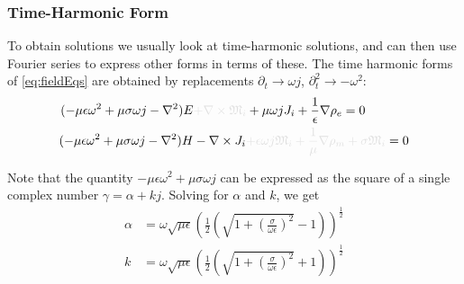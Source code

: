 \documentclass{article}
\numberwithin{equation}{section}
\begin{document}
        \subsubsection{Time-Harmonic Form}
            To obtain solutions we usually look at time-harmonic solutions, and can then
            use Fourier series to express other forms in terms of these. The time
            harmonic forms of \eqref{eq:fieldEqs} are obtained by replacements
            $\partial_t \to \omega j$, $\partial_t^2 \to - \omega^2$:
            \begin{subequations} \label{eq:fieldEqsTH}
                \begin{align}
                    (- \mu \epsilon \omega^2 + \mu \sigma \omega j - \nabla^2 ) E &
                        \begingroup \textcolor{vanish}{+ \nabla \times \mathfrak{M}_i}
                        \endgroup + \mu \omega j J_i + \frac{1}{\epsilon} \nabla \rho_e
                        = 0 \label{eq:electricFieldEqTH} \\
                    (-\mu \epsilon \omega^2 + \mu \sigma \omega j - \nabla^2 ) H & -
                        \nabla \times J_i \begingroup \textcolor{vanish}{+ \epsilon
                        \omega j \mathfrak{M}_i + \frac{1}{\mu} \nabla \rho_m + \sigma
                        \mathfrak{M}_i} \endgroup = 0 \label{eq:magneticFieldEqTH}
                \end{align}
            \end{subequations}

            Note that the quantity $- \mu \epsilon \omega^2 + \mu \sigma \omega j $ can be
            expressed as the square of a single complex number $\gamma = \alpha + kj$.
            Solving for $\alpha$ and $k$, we get
            \begin{subequations}
            \begin{align} \label{eq:attenuationConstant}
                \alpha &= \omega \sqrt{\mu \epsilon} \left( \frac{1}{2} \left( \sqrt{1 +
                    \left( \frac{\sigma}{\omega \epsilon} \right)^2 } - 1 \right)
                    \right)^{\frac{1}{2}} \\
                k &= \omega \sqrt{\mu \epsilon} \left( \frac{1}{2} \left( \sqrt{1 + \left(
                    \frac{\sigma}{\omega \epsilon} \right)^2 } + 1 \right)
                    \right)^{\frac{1}{2}} \label{eq:wavenumber}
            \end{align}
            \end{subequations}
\end{document}
